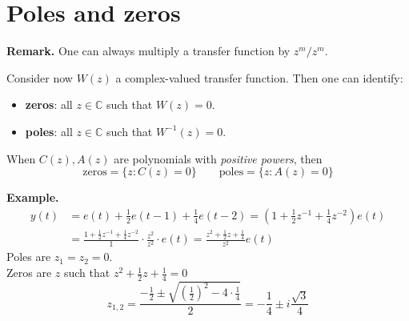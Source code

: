 \section{Poles and zeros}

\textbf{Remark.}
One can always multiply a transfer function by $z^{m}/z^{m}$.

Consider now $W(z)$ a complex-valued transfer function. Then one can identify:
\begin{itemize}
	\item \textbf{zeros}: all $z\in \mathbb{C}$ such that $W(z)=0$.
	\item \textbf{poles}: all $z\in \mathbb{C}$ such that $W^{-1} (z)=0$.
\end{itemize}
When $C(z),A(z)$ are polynomials with \emph{positive powers}, then
\[
	\text{zeros}=\{z:C(z)=0\} \qquad \text{poles}=\{z:A(z)=0\}
\]

\textbf{Example.}
\begin{align*}
y(t) &=e(t)+\frac{1}{2} e(t-1)+\frac{1}{4} e(t-2) =\left(1+\frac{1}{2} z^{-1}+\frac{1}{4} z^{-2}\right) e(t) \\
&=\frac{1+\frac{1}{2} z^{-1}+\frac{1}{4} z^{-2}}{1} \cdot \frac{z^{2}}{z^{2}}\cdot e(t) =\frac{z^{2}+\frac{1}{2} z+\frac{1}{4}}{z^{2}} e(t)
\end{align*}
Poles are $z_{1}=z_{2}=0$.\\
Zeros are $z$ such that $z^{2}+\frac{1}{2} z+\frac{1}{4}=0$
\[
	z_{1,2}=\frac{-\frac{1}{2} \pm \sqrt{\left( \frac{1}{2}  \right) ^2 -4\cdot\frac{1}{4} } }{2} = -\frac{1}{4}\pm i\frac{\sqrt{3} }{4}
\]
\begin{figure}[htpb]
	\centering
\end{figure}
\FloatBarrier

